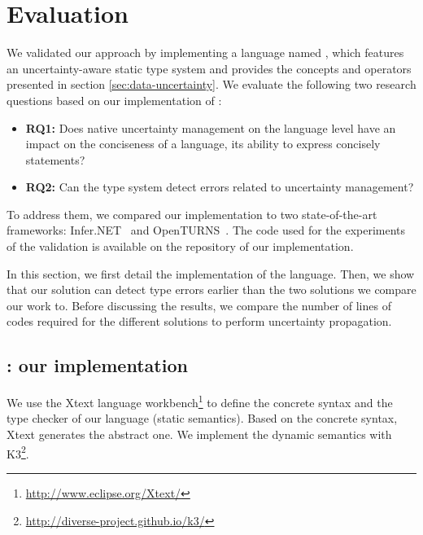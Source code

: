 \section{Evaluation}
\label{sec:validation}

We validated our approach by implementing a language named \languageName{}, which features an uncertainty-aware static type system and provides the concepts and operators presented in section \ref{sec:data-uncertainty}.
We evaluate the following two research questions based on our implementation of \languageName{}:
\begin{itemize}
	\vspace{-0.5em}
	\setlength\itemsep{-0.3em}
	\item \textbf{RQ1:} Does native uncertainty management on the language level have an impact on the conciseness of a language, \ie its ability to express concisely statements? 
	\item \textbf{RQ2:} Can the type system detect errors related to uncertainty management?
\end{itemize}

To address them, we compared our implementation to two state-of-the-art frameworks: Infer.NET~\cite{url:InferNET18} and OpenTURNS~\cite{baudin2017openturns}.
The code used for the experiments of the validation is available on the repository of our implementation.

In this section, we first detail the implementation of the \languageName{} language.
Then, we show that our solution can detect type errors earlier than the two solutions we compare our work to.
Before discussing the results, we compare the number of lines of codes required for the different solutions to perform uncertainty propagation.

\subsection{\languageName{}: our implementation}
\label{sec:uminijava}

We use the Xtext language workbench\footnote{\url{http://www.eclipse.org/Xtext/}} to define the concrete syntax and the type checker of our language (static semantics).
Based on the concrete syntax, Xtext generates the abstract one.
We implement the dynamic semantics with K3\footnote{\url{http://diverse-project.github.io/k3/}}. 

